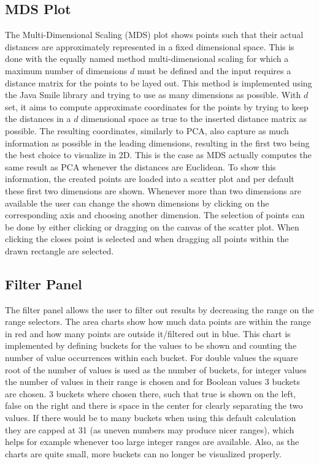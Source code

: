 \documentclass[
	a4paper,
	english,
	twoside,
	openright,               
	11pt                            
	]{report}
\begin{document}
\subsection{MDS Plot}
The Multi-Dimensional Scaling (MDS) plot shows points such that their actual distances are approximately represented in a fixed dimensional space. This is done with the equally named method multi-dimensional scaling \cite{mds} for which a maximum number of dimensions $d$ must be defined and the input requires a distance matrix for the points to be layed out. This method is implemented using the Java Smile \cite{javasmile} library and trying to use as many dimensions as possible. With $d$ set, it aims to compute approximate coordinates for the points by trying to keep the distances in a $d$ dimensional space as true to the inserted distance matrix as possible. The resulting coordinates, similarly to PCA, also capture as much information as possible in the leading dimensions, resulting in the first two being the best choice to visualize in 2D. This is the case as MDS actually computes the same result as PCA whenever the distances are Euclidean. To show this information, the created points are loaded into a scatter plot and per default these first two dimensions are shown. Whenever more than two dimensions are available the user can change the shown dimensions by clicking on the corresponding axis and choosing another dimension. The selection of points can be done by either clicking or dragging on the canvas of the scatter plot. When clicking the closes point is selected and when dragging all points within the drawn rectangle are selected.

\subsection{Filter Panel}
The filter panel allows the user to filter out results by decreasing the range on the range selectors. The area charts show how much data points are within the range in red and how many points are outside it/filtered out in blue. This chart is implemented by defining buckets for the values to be shown and counting the number of value occurrences within each bucket. For double values the square root of the number of values is used as the number of buckets, for integer values the number of values in their range is chosen and for Boolean values 3 buckets are chosen. 3 buckets where chosen there, such that true is shown on the left, false on the right and there is space in the center for clearly separating the two values. If there would be to many buckets when using this default calculation they are capped at 31 (as uneven numbers may produce nicer ranges), which helps for example whenever too large integer ranges are available. Also, as the charts are quite small, more buckets can no longer be visualized properly.
\end{document}
